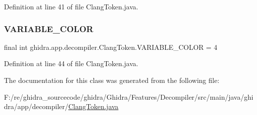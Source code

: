 Definition at line 41 of file Clang\+Token.\+java.

\mbox{\label{classghidra_1_1app_1_1decompiler_1_1_clang_token_aaef3a07a0bdbcbd63609c44a125deb6d}} 
\subsubsection{\texorpdfstring{VARIABLE\_COLOR}{VARIABLE\_COLOR}}
{\footnotesize\ttfamily final int ghidra.\+app.\+decompiler.\+Clang\+Token.\+V\+A\+R\+I\+A\+B\+L\+E\+\_\+\+C\+O\+L\+OR = 4\hspace{0.3cm}{\ttfamily [static]}}



Definition at line 44 of file Clang\+Token.\+java.



The documentation for this class was generated from the following file\+:\begin{DoxyCompactItemize}
\item 
F\+:/re/ghidra\+\_\+sourcecode/ghidra/\+Ghidra/\+Features/\+Decompiler/src/main/java/ghidra/app/decompiler/\mbox{\hyperlink{_clang_token_8java}{Clang\+Token.\+java}}\end{DoxyCompactItemize}

